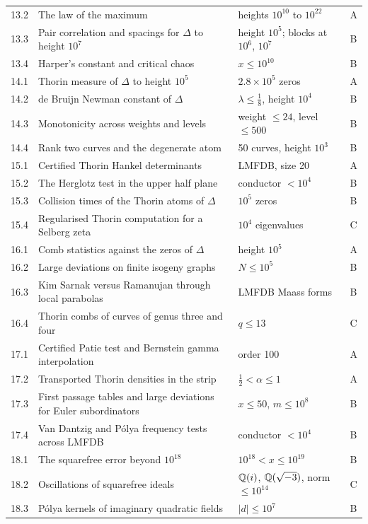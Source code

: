 {\begin{longtable}{p{0.9cm}p{5.3cm}p{3.0cm}p{0.5cm}}
13.2 & The law of the maximum & heights $10^{10}$ to $10^{22}$ & A\\
13.3 & Pair correlation and spacings for $\Delta$ to height $10^7$ & height $10^5$; blocks at $10^6$, $10^7$ & B\\
13.4 & Harper's constant and critical chaos & $x\le 10^{10}$ & B\\
14.1 & Thorin measure of $\Delta$ to height $10^5$ & $2.8\times10^5$ zeros & A\\
14.2 & de Bruijn Newman constant of $\Delta$ & $\lambda\le\tfrac18$, height $10^4$ & B\\
14.3 & Monotonicity across weights and levels & weight $\le24$, \mbox{level $\le500$} & B\\
14.4 & Rank two curves and the degenerate atom & 50 curves, height $10^3$ & B\\
15.1 & Certified Thorin Hankel determinants & LMFDB, size 20 & A\\
15.2 & The Herglotz test in the upper half plane & conductor $<10^4$ & B\\
15.3 & Collision times of the Thorin atoms of $\Delta$ & $10^5$ zeros & B\\
15.4 & Regularised Thorin computation for a Selberg zeta & $10^4$ eigenvalues & C\\
16.1 & Comb statistics against the zeros of $\Delta$ & height $10^5$ & A\\
16.2 & Large deviations on finite isogeny graphs & $N \le 10^5$ & B\\
16.3 & Kim Sarnak versus Ramanujan through local parabolas & LMFDB Maass forms & B\\
16.4 & Thorin combs of curves of genus three and four & $q\le13$ & C\\
17.1 & Certified Patie test and Bernstein gamma interpolation & order 100 & A\\
17.2 & Transported Thorin densities in the strip & $\tfrac12<\alpha\le1$ & A\\
17.3 & First passage tables and large deviations for Euler subordinators & $x\le50$, $m\le10^8$ & B\\
17.4 & Van Dantzig and P\'olya frequency tests across LMFDB & conductor $<10^4$ & B\\
18.1 & The squarefree error beyond $10^{18}$ & $10^{18}<x\le10^{19}$ & B\\
18.2 & Oscillations of squarefree ideals & $\mathbb{Q}(i)$, $\mathbb{Q}(\sqrt{-3})$, norm $\le10^{14}$ & C\\
18.3 & P\'olya kernels of imaginary quadratic fields & $|d|\le10^7$ & B\\

\end{longtable}}
